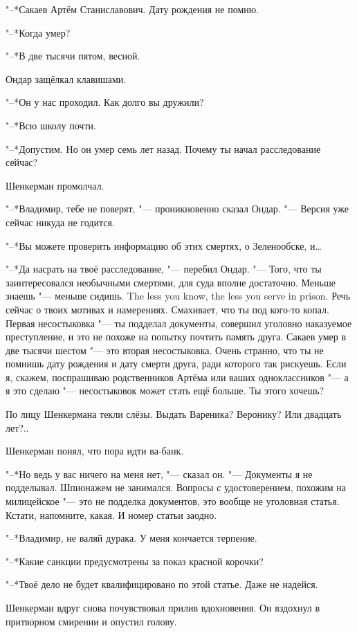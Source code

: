 "--*Сакаев Артём Станиславович.
Дату рождения не помню.

"--*Когда умер?

"--*В две тысячи пятом, весной.

Ондар защёлкал клавишами.

"--*Он у нас проходил.
Как долго вы дружили?

"--*Всю школу почти.

"--*Допустим.
Но он умер семь лет назад.
Почему ты начал расследование сейчас?

Шенкерман промолчал.

"--*Владимир, тебе не поверят, "--- проникновенно сказал Ондар.
"--- Версия уже сейчас никуда не годится.

"--*Вы можете проверить информацию об этих смертях, о Зеленообске, и\dots{}

"--*Да насрать на твоё расследование, "--- перебил Ондар.
"--- Того, что ты заинтересовался необычными смертями, для суда вполне достаточно.
{Меньше знаешь "--- меньше сидишь.}
{The less you know, the less you serve in prison.}
Речь сейчас о твоих мотивах и намерениях.
Смахивает, что ты под кого-то копал.
Первая несостыковка "--- ты подделал документы, совершил уголовно наказуемое преступление, и это не похоже на попытку почтить память друга.
Сакаев умер в две тысячи шестом "--- это вторая несостыковка.
Очень странно, что ты не помнишь дату рождения и дату смерти друга, ради которого так рискуешь.
Если я, скажем, поспрашиваю родственников Артёма или ваших одноклассников "--- а я это сделаю "--- несостыковок может стать ещё больше.
Ты этого хочешь?

По лицу Шенкермана текли слёзы.
Выдать Вареника?
Веронику?
Или двадцать лет?..

Шенкерман понял, что пора идти ва-банк.

"--*Но ведь у вас ничего на меня нет, "--- сказал он.
"--- Документы я не подделывал.
Шпионажем не занимался.
Вопросы с удостоверением, похожим на милицейское "--- это не подделка документов, это вообще не уголовная статья.
Кстати, напомните, какая.
И номер статьи заодно.

"--*Владимир, не валяй дурака.
У меня кончается терпение.

"--*Какие санкции предусмотрены за показ красной корочки?

"--*Твоё дело не будет квалифицировано по этой статье.
Даже не надейся.

Шенкерман вдруг снова почувствовал прилив вдохновения.
Он вздохнул в притворном смирении и опустил голову.

